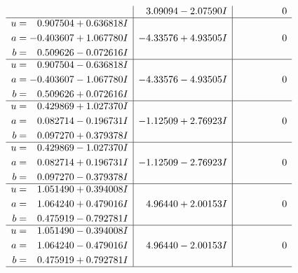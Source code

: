 \documentclass[1p]{elsarticle_modified}
\theoremstyle{definition}
\begin{document}
$$\begin{array}{c|c|c}
 & \phantom{-}3.09094 - 2.07590 I & \phantom{-0.000000 } 0 \\ \hline\begin{aligned}
u &= \phantom{-}0.907504 + 0.636818 I \\
a &= -0.403607 + 1.067780 I \\
b &= \phantom{-}0.509626 - 0.072616 I\end{aligned}
 & -4.33576 + 4.93505 I & \phantom{-0.000000 } 0 \\ \hline\begin{aligned}
u &= \phantom{-}0.907504 - 0.636818 I \\
a &= -0.403607 - 1.067780 I \\
b &= \phantom{-}0.509626 + 0.072616 I\end{aligned}
 & -4.33576 - 4.93505 I & \phantom{-0.000000 } 0 \\ \hline\begin{aligned}
u &= \phantom{-}0.429869 + 1.027370 I \\
a &= \phantom{-}0.082714 - 0.196731 I \\
b &= \phantom{-}0.097270 + 0.379378 I\end{aligned}
 & -1.12509 + 2.76923 I & \phantom{-0.000000 } 0 \\ \hline\begin{aligned}
u &= \phantom{-}0.429869 - 1.027370 I \\
a &= \phantom{-}0.082714 + 0.196731 I \\
b &= \phantom{-}0.097270 - 0.379378 I\end{aligned}
 & -1.12509 - 2.76923 I & \phantom{-0.000000 } 0 \\ \hline\begin{aligned}
u &= \phantom{-}1.051490 + 0.394008 I \\
a &= \phantom{-}1.064240 + 0.479016 I \\
b &= \phantom{-}0.475919 - 0.792781 I\end{aligned}
 & \phantom{-}4.96440 + 2.00153 I & \phantom{-0.000000 } 0 \\ \hline\begin{aligned}
u &= \phantom{-}1.051490 - 0.394008 I \\
a &= \phantom{-}1.064240 - 0.479016 I \\
b &= \phantom{-}0.475919 + 0.792781 I\end{aligned}
 & \phantom{-}4.96440 - 2.00153 I & \phantom{-0.000000 } 0\\
 \hline 
 \end{array}$$\newpage$$\begin{array}{c|c|c}  

\end{array}$$
\end{document}
